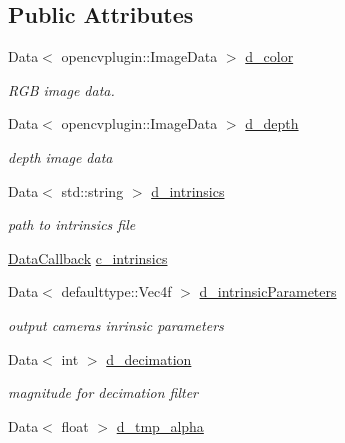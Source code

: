 \subsection*{Public Attributes}
\begin{DoxyCompactItemize}
\item 
Data$<$ opencvplugin\+::\+Image\+Data $>$ \hyperlink{classsofa_1_1rgbdtracking_1_1_real_sense_streamer_a4a21504b1c8de26cda98a7dd1b7d43d2}{d\+\_\+color}
\begin{DoxyCompactList}\small\item\em R\+GB image data. \end{DoxyCompactList}\item 
Data$<$ opencvplugin\+::\+Image\+Data $>$ \hyperlink{classsofa_1_1rgbdtracking_1_1_real_sense_streamer_a9fbddc186f4026f029c509b49f5b16f5}{d\+\_\+depth}
\begin{DoxyCompactList}\small\item\em depth image data \end{DoxyCompactList}\item 
Data$<$ std\+::string $>$ \hyperlink{classsofa_1_1rgbdtracking_1_1_real_sense_streamer_a226a9797423c62c033f9f1961c00cb7c}{d\+\_\+intrinsics}
\begin{DoxyCompactList}\small\item\em path to intrinsics file \end{DoxyCompactList}\item 
\hyperlink{namespacesofa_1_1rgbdtracking_a00834a9204a667746fef9a402ccbfb55}{Data\+Callback} \hyperlink{classsofa_1_1rgbdtracking_1_1_real_sense_streamer_a22b457cc55e1b6c1b0ce649c27c20ee6}{c\+\_\+intrinsics}
\item 
Data$<$ defaulttype\+::\+Vec4f $>$ \hyperlink{classsofa_1_1rgbdtracking_1_1_real_sense_streamer_a74e34153116c11df21f4b4630317e8b0}{d\+\_\+intrinsic\+Parameters}
\begin{DoxyCompactList}\small\item\em output camera\textquotesingle{}s inrinsic parameters \end{DoxyCompactList}\item 
Data$<$ int $>$ \hyperlink{classsofa_1_1rgbdtracking_1_1_real_sense_streamer_a9a2ee35697a6b660e31c60bee13382f5}{d\+\_\+decimation}
\begin{DoxyCompactList}\small\item\em magnitude for decimation filter \end{DoxyCompactList}\item 
Data$<$ float $>$ \hyperlink{classsofa_1_1rgbdtracking_1_1_real_sense_streamer_a3c990ea526b262dd9bfff7e0245ac443}{d\+\_\+tmp\+\_\+alpha}

\end{DoxyCompactItemize}
